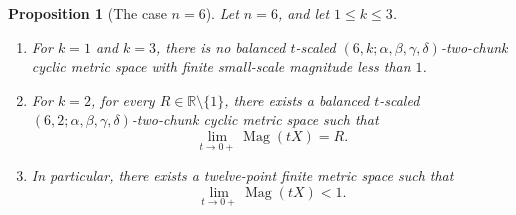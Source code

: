 \documentclass[11pt]{amsart}
\numberwithin{equation}{section}
\newtheorem{proposition}[theorem]{Proposition}
\theoremstyle{definition}
\theoremstyle{remark}
\DeclareMathOperator{\Mag}{Mag}
\newcommand{\R}{\mathbb{R}}
\begin{document}
\begin{proposition}[The case \(n=6\)]\label{prop:n-six}
Let \(n=6\), and let \(1\leq k\leq 3\).
\begin{enumerate}[label=\textup{(\arabic*)}]
\item For \(k=1\) and \(k=3\), there is no balanced \(t\)-scaled \((6,k;\alpha,\beta,\gamma,\delta)\)-two-chunk cyclic metric space with finite small-scale magnitude less than \(1\).
\item For \(k=2\), for every \(R\in\R\setminus\{1\}\), there exists a balanced \(t\)-scaled \((6,2;\alpha,\beta,\gamma,\delta)\)-two-chunk cyclic metric space such that
\begin{equation}\label{eq:n6k2-arbitrary-R}
\lim_{t\to 0+}\Mag(tX)=R.
\end{equation}
\item In particular, there exists a twelve-point finite metric space such that
\begin{equation}\label{eq:twelve-point-below-one}
\lim_{t\to 0+}\Mag(tX)<1.
\end{equation}
\end{enumerate}
\end{proposition}
\end{document}
